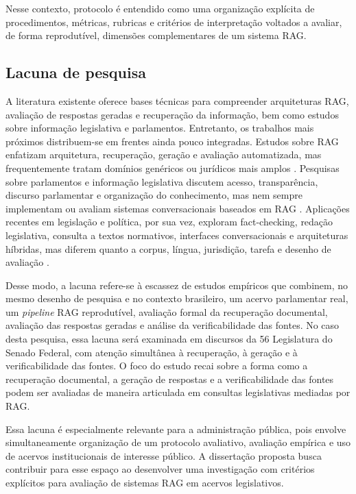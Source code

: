 Nesse contexto, protocolo é entendido como uma organização explícita de procedimentos, métricas, rubricas e critérios de interpretação voltados a avaliar, de forma reprodutível, dimensões complementares de um sistema RAG.

\subsection{Lacuna de pesquisa}

A literatura existente oferece bases técnicas para compreender arquiteturas RAG, avaliação de respostas geradas e recuperação da informação, bem como estudos sobre informação legislativa e parlamentos. Entretanto, os trabalhos mais próximos distribuem-se em frentes ainda pouco integradas. Estudos sobre RAG enfatizam arquitetura, recuperação, geração e avaliação automatizada, mas frequentemente tratam domínios genéricos ou jurídicos mais amplos \parencite{gao2023ragSurvey,saadFalconEtAl2024ares,esEtAl2023ragas,pipitoneAlami2024legalbenchRag}. Pesquisas sobre parlamentos e informação legislativa discutem acesso, transparência, discurso parlamentar e organização do conhecimento, mas nem sempre implementam ou avaliam sistemas conversacionais baseados em RAG \parencite{skubicFiser2024discourseReview,blanco2025plenarioPalanqueEstudio,blanco2026letrasGraudas,martelloteViola2025organizacaoConhecimento}. Aplicações recentes em legislação e política, por sua vez, exploram fact-checking, redação legislativa, consulta a textos normativos, interfaces conversacionais e arquiteturas híbridas, mas diferem quanto a corpus, língua, jurisdição, tarefa e desenho de avaliação \parencite{khaliq2024ragar,chouhanGertz2024lexdrafter,garrisonEtAl2024talkNdaa,rogiersEtAl2024kamerraad,matoshiEtAl2025parliamentRag,colomboEtAl2025legisSearch,mosbachEtAl2025worldAvatarParliament}.

Desse modo, a lacuna refere-se à escassez de estudos empíricos que combinem, no mesmo desenho de pesquisa e no contexto brasileiro, um acervo parlamentar real, um \textit{pipeline} RAG reprodutível, avaliação formal da recuperação documental, avaliação das respostas geradas e análise da verificabilidade das fontes. No caso desta pesquisa, essa lacuna será examinada em discursos da 56\textordfeminine{} Legislatura do Senado Federal, com atenção simultânea à recuperação, à geração e à verificabilidade das fontes. O foco do estudo recai sobre a forma como a recuperação documental, a geração de respostas e a verificabilidade das fontes podem ser avaliadas de maneira articulada em consultas legislativas mediadas por RAG.

Essa lacuna é especialmente relevante para a administração pública, pois envolve simultaneamente organização de um protocolo avaliativo, avaliação empírica e uso de acervos institucionais de interesse público. A dissertação proposta busca contribuir para esse espaço ao desenvolver uma investigação com critérios explícitos para avaliação de sistemas RAG em acervos legislativos.
